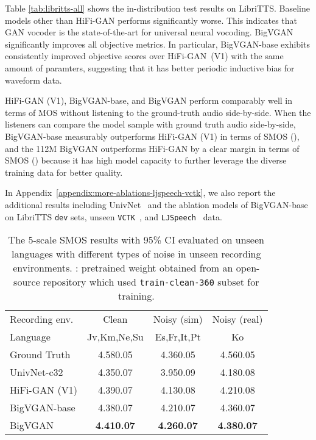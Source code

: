 \documentclass{article} \usepackage{iclr2023_conference,times}
\theoremstyle{plain}
\theoremstyle{definition}
\theoremstyle{remark}
\begin{document}
Table \ref{tab:libritts-all} shows the in-distribution test results on LibriTTS. Baseline models other than HiFi-GAN performs significantly worse. This indicates that GAN vocoder is the state-of-the-art for universal neural vocoding. BigVGAN significantly improves all objective metrics. In particular, BigVGAN-base exhibits consistently improved objective scores over HiFi-GAN~(V1) with the same amount of paramters, suggesting that it has better periodic inductive bias for waveform data.

HiFi-GAN (V1), BigVGAN-base, and BigVGAN perform comparably well in terms of MOS without listening to the ground-truth audio side-by-side. 
When the listeners can compare the model sample with ground truth audio side-by-side, BigVGAN-base measurably outperforms HiFi-GAN (V1) in terms of SMOS (), and the 112M BigVGAN outperforms HiFi-GAN by a clear margin in terms of SMOS () because it has high model capacity to further leverage the diverse training data for better quality.


In Appendix~\ref{appendix:more-ablations-ljspeech-vctk}, we also report the additional results including UnivNet~\citep{jang2021univnet} and the ablation models of BigVGAN-base on LibriTTS \texttt{dev} sets, unseen \texttt{VCTK}~\citep{yamagishi2019cstr}, and \texttt{LJSpeech}~\citep{Ito2017ljspeech} data.


\begin{table}[t]
\vspace{-.2cm}
\caption{\footnotesize 
The 5-scale SMOS results with 95\% CI evaluated on unseen languages with different types of noise in unseen recording environments. : pretrained weight obtained from an open-source repository which used \texttt{train-clean-360} subset for training.}
\label{tab:multi-language}
\vspace{-0.1cm}
\begin{center}
\begin{small}
\begin{tabular}{l|ccc}
\toprule
Recording env.  & Clean & Noisy (sim) & Noisy (real)  \\
Language & Jv,Km,Ne,Su & Es,Fr,It,Pt & Ko \\
\midrule
Ground Truth & 4.580.05 & 4.360.05 & 4.560.05 \\
\midrule
UnivNet-c32 & 4.350.07 & 3.950.09 & 4.180.08 \\
HiFi-GAN (V1) & 4.390.07 & 4.130.08 & 4.210.08 \\
BigVGAN-base & 4.380.07 & 4.210.07 & 4.360.07 \\
BigVGAN & \textbf{4.410.07} & \textbf{4.260.07} & \textbf{4.380.07} \\
\bottomrule
\end{tabular}
\end{small}
\end{center}
\vskip -0.1in
\end{table}
\end{document}
